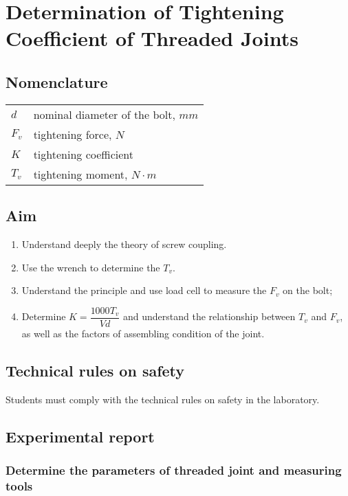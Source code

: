 \chapter{Determination of Tightening Coefficient of Threaded Joints}

\section{Nomenclature}
\begin{tabular}{lp{6.5cm}}
	$ d  $ & nominal diameter of the bolt, $ \unit{mm} $\\
	$ F_v $ & tightening force, $ \unit{N} $\\
	$ K $ & tightening coefficient\\
	$ T_v $ & tightening moment, $ \unit{N\cdot m} $\\
\end{tabular}

\section{Aim}
\begin{enumerate}
	\item Understand deeply the theory of screw coupling.
	\item Use the wrench to determine the $ T_v $.
	\item Understand the principle and use load cell to measure the $ F_v $ on the	bolt;
	\item Determine $ K = \dfrac{1000T_v}{Vd} $ and understand the relationship between $ T_v $ and $ F_v $, as well as the factors of assembling condition of the joint.
\end{enumerate}

\section{Technical rules on safety}
Students must comply with the technical rules on safety in the laboratory.

\section{Experimental report}

\subsection{Determine the parameters of threaded joint and measuring tools}
